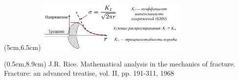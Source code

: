 \documentclass{beamer}
\begin{document}
\begin{frame}
\begin{textblock*}{7.5cm}(5cm,6.5cm)
\includegraphics[width=7.5cm]{part4_propagation.jpg}
\end{textblock*}

\begin{textblock*}{6cm}(0.5cm,8.9cm)
\tiny
\textcolor{lit_gray}{J.R. Rice. Mathematical analysis in the mechanics of fracture. Fracture: an advanced treatise, vol. II, pp. 191-311, 1968}
\end{textblock*}

\end{frame}
\end{document}
